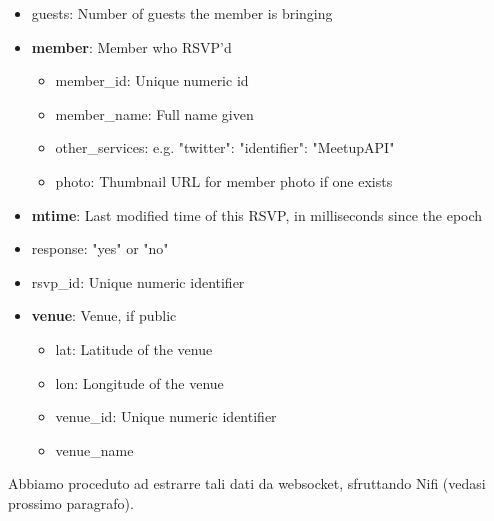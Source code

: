 \documentclass[fleqn,10pt]{SelfArx} %
\begin{document}
{\begin{itemize}[noitemsep]
\item guests: Number of guests the member is bringing
\item \textbf{member}: Member who RSVP'd
	\begin{itemize}[noitemsep]
    \item member\_id: Unique numeric id
    \item member\_name: Full name given
    \item other\_services: e.g. {"twitter": {"identifier": "MeetupAPI"}}
    \item photo: Thumbnail URL for member photo if one exists
	\end{itemize}
\item \textbf{mtime}: Last modified time of this RSVP, in milliseconds since the epoch
\item response: "yes" or "no"
\item rsvp\_id: Unique numeric identifier
\item \textbf{venue}: Venue, if public
	\begin{itemize}[noitemsep]
    \item lat: Latitude of the venue
    \item lon: Longitude of the venue
    \item venue\_id: Unique numeric identifier
    \item venue\_name
	\end{itemize}    
\end{itemize}
Abbiamo proceduto ad estrarre tali dati da websocket, sfruttando Nifi (vedasi prossimo paragrafo).
}
\end{document}

